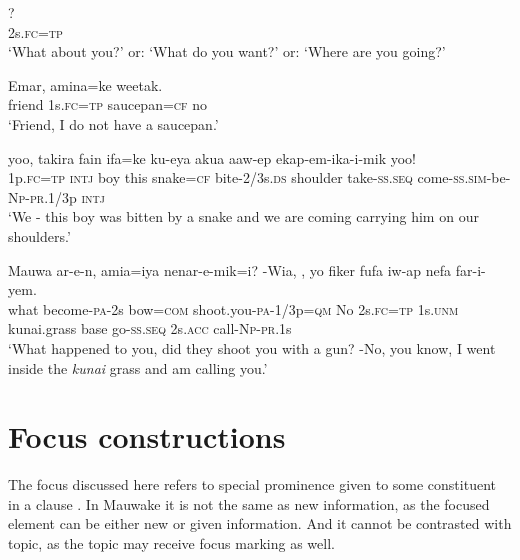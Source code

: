\ea%
\label{ex:x1684}
\gll {}? \\
2s.\textsc{fc}=\textsc{tp}      \\
\glt`What about you?' or: `What do you want?' or: `Where are you going?'
\z


\ea%
\label{ex:x1685}
\gll Emar,    amina=ke  weetak. \\
friend  1s.\textsc{fc}=\textsc{tp}  saucepan=\textsc{cf}  no      \\
\glt`Friend, I do not have a saucepan.'
\z


\ea%
\label{ex:x1686}
\gll {}  yoo,  takira  fain  ifa=ke  ku-eya  akua aaw-ep  ekap-em-ika-i-mik  yoo! \\
1p.\textsc{fc}=\textsc{tp}  \textsc{intj}  boy  this  snake=\textsc{cf}  bite-2/3s.\textsc{ds}  shoulder take-\textsc{ss}.\textsc{seq}  come-\textsc{ss}.\textsc{sim}-be-\textsc{Np}-\textsc{pr}.1/3p  \textsc{intj}     \\
\glt`We - this boy was bitten by a snake and we are coming carrying him on our shoulders.'
\z


\ea%
\label{ex:x1687}
\gll Mauwa  ar-e-n,  amia=iya  nenar-e-mik=i? -Wia,  ,  yo  fiker  fufa  iw-ap  nefa far-i-yem.\\
what  become-\textsc{pa}-2s  bow=\textsc{com}  shoot.you-\textsc{pa}-1/3p=\textsc{qm} No  2s.\textsc{fc}=\textsc{tp}  1s.\textsc{unm}  kunai.grass  base  go-\textsc{ss}.\textsc{seq}  2s.\textsc{acc} call-\textsc{Np}-\textsc{pr}.1s    \\
\glt`What happened to you, did they shoot you with a gun? -No, you know, I went inside the \textit{kunai} grass and am calling you.'
\z


\section{Focus constructions}{\footnotemark}

The focus discussed here refers to special prominence given to some constituent in a clause \citep[174]{Dixon2010a}. In Mauwake it is not the same as new information, as the focused element can be either new or given information. And it cannot be contrasted with topic, as the topic may receive focus marking as well. 

